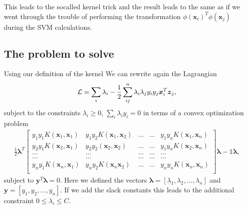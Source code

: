 \documentclass[letterpaper,10pt,english]{sphinxmanual}
\begin{document}
This leads to the so\sphinxhyphen{}called
kernel trick and the result leads to the same as if we went through
the trouble of performing the transformation
\(\phi(\boldsymbol{x}_i)^T\phi(\boldsymbol{x}_j)\) during the SVM calculations.


\subsection{The problem to solve}
\label{\detokenize{chapter7:id1}}
Using our definition of the kernel We can rewrite again the Lagrangian
\begin{equation*}
\begin{split}
{\cal L}=\sum_i\lambda_i-\frac{1}{2}\sum_{ij}^n\lambda_i\lambda_jy_iy_j\boldsymbol{x}_i^T\boldsymbol{z}_j,
\end{split}
\end{equation*}
subject to the constraints \(\lambda_i\geq 0\), \(\sum_i\lambda_iy_i=0\) in terms of a convex optimization problem
\begin{equation*}
\begin{split}
\frac{1}{2} \boldsymbol{\lambda}^T\begin{bmatrix} y_1y_1K(\boldsymbol{x}_1,\boldsymbol{x}_1) & y_1y_2K(\boldsymbol{x}_1,\boldsymbol{x}_2) & \dots & \dots & y_1y_nK(\boldsymbol{x}_1,\boldsymbol{x}_n) \\
y_2y_1K(\boldsymbol{x}_2,\boldsymbol{x}_1) & y_2y_2(\boldsymbol{x}_2,\boldsymbol{x}_2) & \dots & \dots & y_1y_nK(\boldsymbol{x}_2,\boldsymbol{x}_n) \\
\dots & \dots & \dots & \dots & \dots \\
\dots & \dots & \dots & \dots & \dots \\
y_ny_1K(\boldsymbol{x}_n,\boldsymbol{x}_1) & y_ny_2K(\boldsymbol{x}_n\boldsymbol{x}_2) & \dots & \dots & y_ny_nK(\boldsymbol{x}_n,\boldsymbol{x}_n) \\
\end{bmatrix}\boldsymbol{\lambda}-\mathbb{1}\boldsymbol{\lambda},
\end{split}
\end{equation*}
subject to \(\boldsymbol{y}^T\boldsymbol{\lambda}=0\). Here we defined the vectors \(\boldsymbol{\lambda} =[\lambda_1,\lambda_2,\dots,\lambda_n]\) and
\(\boldsymbol{y}=[y_1,y_2,\dots,y_n]\).
If we add the slack constants this leads to the additional constraint \(0\leq \lambda_i \leq C\).
\end{document}
